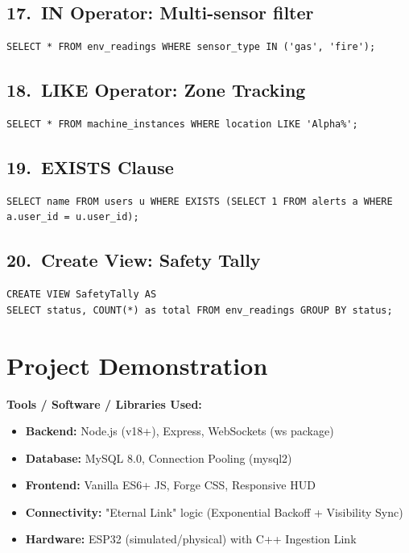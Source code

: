 \documentclass[12pt, a4paper]{article}
\begin{document}
\subsection{17.\ IN Operator: Multi-sensor filter}
\begin{lstlisting}
SELECT * FROM env_readings WHERE sensor_type IN ('gas', 'fire');
\end{lstlisting}

\subsection{18.\ LIKE Operator: Zone Tracking}
\begin{lstlisting}
SELECT * FROM machine_instances WHERE location LIKE 'Alpha%';
\end{lstlisting}

\subsection{19.\ EXISTS Clause}
\begin{lstlisting}
SELECT name FROM users u WHERE EXISTS (SELECT 1 FROM alerts a WHERE a.user_id = u.user_id);
\end{lstlisting}

\subsection{20.\ Create View: Safety Tally}
\begin{lstlisting}
CREATE VIEW SafetyTally AS
SELECT status, COUNT(*) as total FROM env_readings GROUP BY status;
\end{lstlisting}

\section{Project Demonstration}
\textbf{Tools / Software / Libraries Used:}
\begin{itemize}
    \item \textbf{Backend:} Node.js (v18+), Express, WebSockets (ws package)
    \item \textbf{Database:} MySQL 8.0, Connection Pooling (mysql2)
    \item \textbf{Frontend:} Vanilla ES6+ JS, Forge CSS, Responsive HUD
    \item \textbf{Connectivity:} "Eternal Link" logic (Exponential Backoff + Visibility Sync)
    \item \textbf{Hardware:} ESP32 (simulated/physical) with C++ Ingestion Link
\end{itemize}
\end{document}
